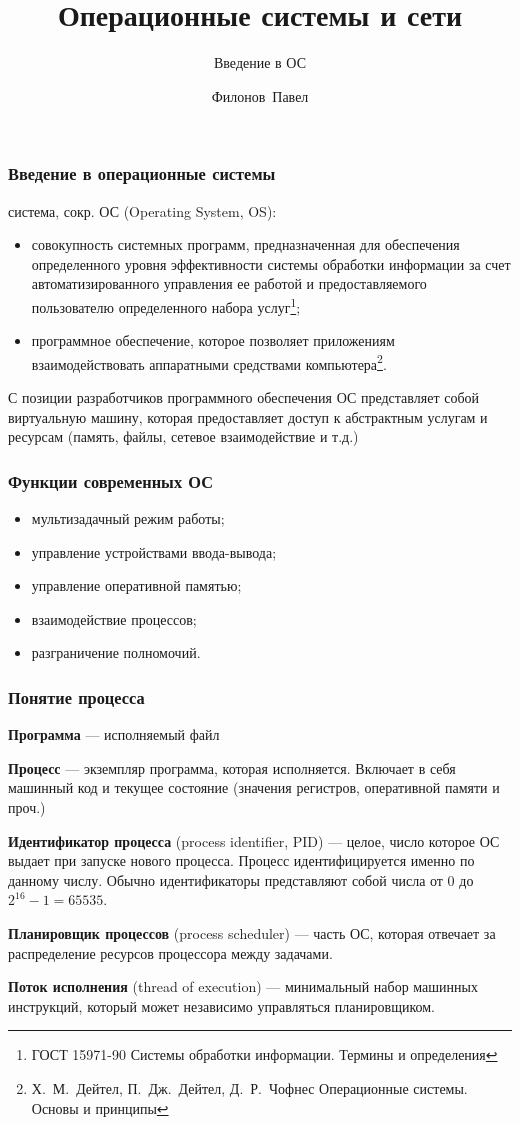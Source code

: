 \documentclass{beamer}
\title{Операционные системы и сети}
\subtitle{Введение в ОС}
\author{Филонов~Павел}
\institute{filonovpv@gmail.com}
\begin{document}
\titlepage
\begin{frame}
    \frametitle{Введение в операционные системы}
    { система}, сокр. ОС (Operating System, OS):
    \begin{itemize}
        \item совокупность 
    системных программ, предназначенная для обеспечения определенного уровня 
    эффективности системы обработки информации за счет автоматизированного 
    управления ее работой и предоставляемого пользователю определенного набора
    услуг\footnote{ГОСТ 15971-90 Системы обработки информации. Термины и определения};
        \item программное обеспечение, которое позволяет приложениям взаимодействовать
    аппаратными средствами компьютера\footnote{Х.~М.~Дейтел, П.~Дж.~Дейтел, Д.~Р.~Чофнес
    Операционные системы. Основы и принципы}.
    \end{itemize}
    С позиции разработчиков программного обеспечения ОС представляет собой виртуальную
    машину, которая предоставляет доступ к абстрактным услугам и ресурсам (память, файлы, сетевое взаимодействие и т.д.)
\end{frame}

\begin{frame}
    \frametitle{Функции современных ОС}
    \begin{itemize}
        \item мультизадачный режим работы;
        \item управление устройствами ввода-вывода;
        \item управление оперативной памятью;
        \item взаимодействие процессов;
        \item разграничение полномочий.
    \end{itemize}
\end{frame}

\begin{frame}
    \frametitle{Понятие процесса}
    {\bf Программа} --- исполняемый файл

    {\bf Процесс} --- экземпляр программа, которая исполняется. Включает в себя
    машинный код и текущее состояние (значения регистров, оперативной памяти и проч.)

    {\bf Идентификатор процесса} (process identifier, PID) --- целое, число которое ОС
    выдает при запуске нового процесса. Процесс идентифицируется именно по данному числу.
    Обычно идентификаторы представляют собой числа от 0 до $2^16 - 1= 65535$.

    {\bf Планировщик процессов} (process scheduler) --- часть ОС, которая отвечает за
    распределение ресурсов процессора между задачами.

    {\bf Поток исполнения} (thread of execution) --- минимальный набор машинных инструкций, который может независимо управляться планировщиком.
\end{frame}
\end{document}
